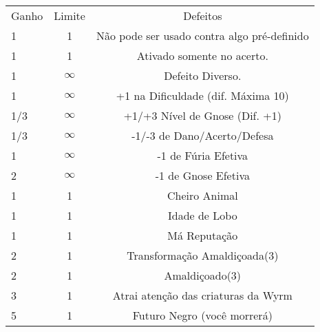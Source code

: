 \begin{table}[!htpb]
\begin{tabular}{|l c c|}
Ganho & Limite & Defeitos \\
\rowcolor[HTML]{EFEFEF} 
1	&		1		&	Não pode ser usado contra algo pré-definido	\\
1	&	 	1		&	Ativado somente no acerto.					\\
\rowcolor[HTML]{EFEFEF} 
1	&	$\infty$	&	Defeito Diverso.							\\
1	&	$\infty$	&	+1 na Dificuldade (dif. Máxima 10)			\\
\rowcolor[HTML]{EFEFEF} 
1/3	&	$\infty$	&	+1/+3 Nível de Gnose (Dif. +1)				\\
1/3	&	$\infty$	&	-1/-3 de Dano/Acerto/Defesa					\\
\rowcolor[HTML]{EFEFEF} 
1	&	$\infty$	&	-1 de Fúria Efetiva							\\
2	&	$\infty$	&	-1 de Gnose Efetiva							\\
\rowcolor[HTML]{EFEFEF} 
1	& 		1		&	Cheiro Animal								\\
1	& 		1		&	Idade de Lobo								\\
\rowcolor[HTML]{EFEFEF} 
1	& 		1		&	Má Reputação								\\
2	& 		1		&	Transformação Amaldiçoada(3)				\\
\rowcolor[HTML]{EFEFEF} 
2	& 		1		&	Amaldiçoado(3)								\\
3	& 		1		&	Atrai atenção das criaturas da Wyrm			\\
\rowcolor[HTML]{EFEFEF} 
5	&	 	1		&	Futuro Negro (você morrerá)					\\

\hline
\end{tabular}
\end{table}

